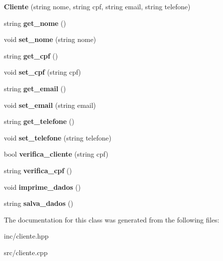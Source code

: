 \begin{DoxyCompactItemize}
\item 
\mbox{\label{class_cliente_a7b2229475422c8e630d3ef18942fbf0d}} 
{\bfseries Cliente} (string nome, string cpf, string email, string telefone)
\item 
\mbox{\label{class_cliente_ae25672e2caaad4b621d868519747137b}} 
string {\bfseries get\+\_\+nome} ()
\item 
\mbox{\label{class_cliente_a7cc80f947a4e62a7623e6c3bb0cb0ef0}} 
void {\bfseries set\+\_\+nome} (string nome)
\item 
\mbox{\label{class_cliente_a093f55c599f35d80f0dffc2353414950}} 
string {\bfseries get\+\_\+cpf} ()
\item 
\mbox{\label{class_cliente_a2d3a1e3d2ee79f4f88ceaa8a8757f87d}} 
void {\bfseries set\+\_\+cpf} (string cpf)
\item 
\mbox{\label{class_cliente_a4ee3af001aef36ace0f6f07611d6d18b}} 
string {\bfseries get\+\_\+email} ()
\item 
\mbox{\label{class_cliente_af37b3b0d7bc542523dc077649842516e}} 
void {\bfseries set\+\_\+email} (string email)
\item 
\mbox{\label{class_cliente_aff1eb27693522ea7e66bba4496fdbca4}} 
string {\bfseries get\+\_\+telefone} ()
\item 
\mbox{\label{class_cliente_a3087f1a2e20ca52e4bd16ea3156e0747}} 
void {\bfseries set\+\_\+telefone} (string telefone)
\item 
\mbox{\label{class_cliente_a6818bb286b8fbaaf6056fab6fb2c24ec}} 
bool {\bfseries verifica\+\_\+cliente} (string cpf)
\item 
\mbox{\label{class_cliente_a57de17bbebc2b90e1732cdbbd9b15e30}} 
string {\bfseries verifica\+\_\+cpf} ()
\item 
\mbox{\label{class_cliente_a62328e77ee9e9621db1effdb30d44a9f}} 
void {\bfseries imprime\+\_\+dados} ()
\item 
\mbox{\label{class_cliente_a0c37adb2060050740b7b330fbffdd134}} 
string {\bfseries salva\+\_\+dados} ()
\end{DoxyCompactItemize}


The documentation for this class was generated from the following files\+:\begin{DoxyCompactItemize}
\item 
inc/cliente.\+hpp\item 
src/cliente.\+cpp\end{DoxyCompactItemize}
